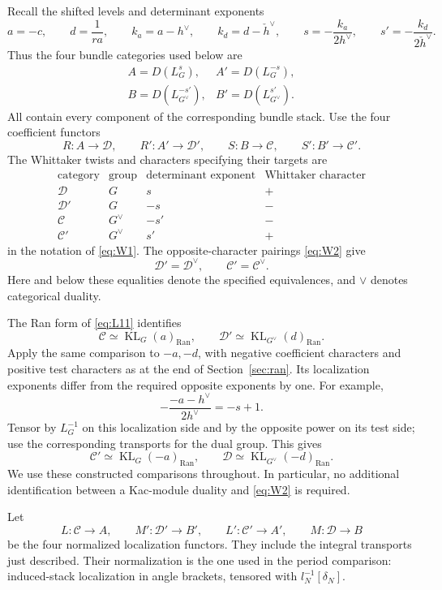 \documentclass[11pt]{article}
\numberwithin{equation}{section}
\theoremstyle{definition}
\theoremstyle{remark}
\begin{document}
Recall the shifted levels and determinant exponents
\[
 a=-c,\qquad d=\frac1{ra},\qquad
 k_a=a-h^\vee,\qquad k_d=d-\check h^\vee,\qquad
 s=-\frac{k_a}{2h^\vee},\qquad
 s'=-\frac{k_d}{2\check h^\vee}.
\]
Thus the four bundle categories used below are
\[
 \begin{array}{ll}
 A=D(L_G^s),& A'=D(L_G^{-s}),\\
 B=D(L_{G^\vee}^{-s'}),&B'=D(L_{G^\vee}^{s'}).
 \end{array}
\]
All contain every component of the corresponding bundle stack.  Use the
four coefficient functors
\[
 R:A\longrightarrow\mathcal D,\qquad
 R':A'\longrightarrow\mathcal D',\qquad
 S:B\longrightarrow\mathcal C,\qquad
 S':B'\longrightarrow\mathcal C'.
\]
The Whittaker twists and characters specifying their targets are
\[
 \begin{array}{c|c|c|c}
 \text{category}&\text{group}&\text{determinant exponent}&
       \text{Whittaker character}\\ \hline
 \mathcal D&G&s&+\\
 \mathcal D'&G&-s&-\\
 \mathcal C&G^\vee&-s'&-\\
 \mathcal C'&G^\vee&s'&+
 \end{array}
\]
in the notation of \eqref{eq:W1}.  The opposite-character pairings
\eqref{eq:W2} give
\[
 \mathcal D'=\mathcal D^\vee,\qquad
 \mathcal C'=\mathcal C^\vee.
\]
Here and below these equalities denote the specified equivalences, and
\(\vee\) denotes categorical duality.

The Ran form of \eqref{eq:L11} identifies
\[
 \mathcal C\simeq\operatorname{KL}_G(a)_{\operatorname{Ran}},\qquad
 \mathcal D'\simeq\operatorname{KL}_{G^\vee}(d)_{\operatorname{Ran}}.
\]
Apply the same comparison to \(-a,-d\), with negative coefficient
characters and positive test characters as at the end of
Section~\ref{sec:ran}.  Its localization exponents differ from the
required opposite exponents by one.  For example,
\[
 -\frac{-a-h^\vee}{2h^\vee}=-s+1.
\]
Tensor by \(L_G^{-1}\) on this localization side and by the opposite
power on its test side; use the corresponding transports for the dual
group.  This gives
\[
 \mathcal C'\simeq\operatorname{KL}_G(-a)_{\operatorname{Ran}},\qquad
 \mathcal D\simeq\operatorname{KL}_{G^\vee}(-d)_{\operatorname{Ran}}.
\]
We use these constructed comparisons throughout.  In particular, no
additional identification between a Kac-module duality and
\eqref{eq:W2} is required.

Let
\[
 L:\mathcal C\longrightarrow A,\qquad
 M':\mathcal D'\longrightarrow B',\qquad
 L':\mathcal C'\longrightarrow A',\qquad
 M:\mathcal D\longrightarrow B
\]
be the four normalized localization functors.  They include the integral
transports just described.  Their normalization is the one used in the
period comparison: induced-stack localization in angle brackets, tensored
with \(l_N^{-1}[\delta_N]\).
\end{document}
